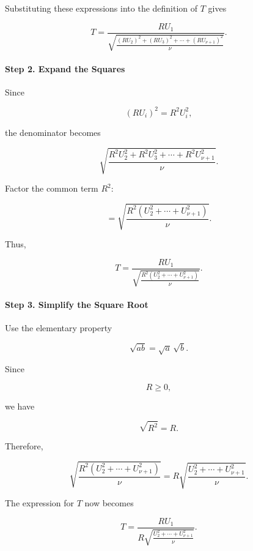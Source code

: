 \documentclass[11pt]{article}
\begin{document}
\begin{mdframed}[
		linewidth=0.8pt,
		roundcorner=6pt,
		backgroundcolor=gray!5,
		linecolor=gray!60,
		innertopmargin=10pt,
		innerbottommargin=10pt,
		innerleftmargin=10pt,
		innerrightmargin=10pt
		]
		Substituting these expressions into the definition of $T$ gives
		
		\[
		T
		=
		\frac{RU_1}
		{
			\sqrt{
				\frac{
					(RU_2)^2+(RU_3)^2+\cdots+(RU_{\nu+1})^2
				}{\nu}
			}
		}.
		\]
		
		\vspace{0.3cm}
		
		\paragraph{Step 2. Expand the Squares}
		
		Since
		
		\[
		(RU_i)^2=R^2U_i^2,
		\]
		
		the denominator becomes
		
		\[
		\sqrt{
			\frac{
				R^2U_2^2
				+
				R^2U_3^2
				+\cdots+
				R^2U_{\nu+1}^2
			}{\nu}
		}.
		\]
		
		Factor the common term $R^2$:
		
		\[
		=
		\sqrt{
			\frac{
				R^2
				\left(
				U_2^2+\cdots+U_{\nu+1}^2
				\right)
			}{\nu}
		}.
		\]
		
		Thus,
		
		\[
		T
		=
		\frac{RU_1}
		{
			\sqrt{
				\frac{
					R^2
					\left(
					U_2^2+\cdots+U_{\nu+1}^2
					\right)
				}{\nu}
			}
		}.
		\]
		
		\vspace{0.3cm}
		
		\paragraph{Step 3. Simplify the Square Root}
		
		Use the elementary property
		
		\[
		\sqrt{ab}
		=
		\sqrt a\,\sqrt b.
		\]
		
		Since
		
		\[
		R\ge0,
		\]
		
		we have
		
		\[
		\sqrt{R^2}=R.
		\]
		
		Therefore,
		
		\[
		\sqrt{
			\frac{
				R^2
				\left(
				U_2^2+\cdots+U_{\nu+1}^2
				\right)
			}{\nu}
		}
		=
		R
		\sqrt{
			\frac{
				U_2^2+\cdots+U_{\nu+1}^2
			}{\nu}
		}.
		\]
		
		The expression for $T$ now becomes
		
		\[
		T
		=
		\frac{RU_1}
		{
			R
			\sqrt{
				\frac{
					U_2^2+\cdots+U_{\nu+1}^2
				}{\nu}
			}
		}.
		\]
		

\end{mdframed}
\end{document}
